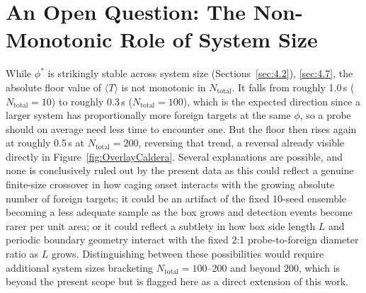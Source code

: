 \section{An Open Question: The Non-Monotonic Role of System Size}
\label{sec:4.10}
While $\phi^*$ is strikingly stable across system size (Sections~\ref{sec:4.2}), \ref{sec:4.7}, the absolute floor value of $\langle T \rangle$ is not monotonic in $N_\text{total}$. It falls from roughly 1.0\,s ($N_\text{total} = 10$) to roughly 0.3\,s ($N_\text{total} = 100$), which is the expected direction since a larger system has proportionally more foreign targets at the same $\phi$, so a probe should on average need less time to encounter one. But the floor then rises again at roughly 0.5\,s at $N_\text{total} = 200$, reversing that trend, a reversal already visible directly in Figure~\ref{fig:OverlayCaldera}. Several explanations are possible, and none is conclusively ruled out by the present data as this could reflect a genuine finite-size crossover in how caging onset interacts with the growing absolute number of foreign targets; it could be an artifact of the fixed 10-seed ensemble becoming a less adequate sample as the box grows and detection events become rarer per unit area; or it could reflect a subtlety in how box side length $L$ and periodic boundary geometry interact with the fixed 2:1 probe-to-foreign diameter ratio as $L$ grows. Distinguishing between these possibilities would require additional system sizes bracketing $N_\text{total} = 100$--200 and beyond 200, which is beyond the present scope but is flagged here as a direct extension of this work.

